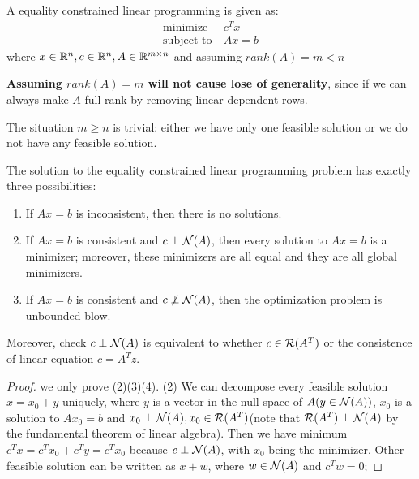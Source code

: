 \begin{refsection}
\begin{definition}
	A equality constrained linear programming is given as:
	\begin{align*}
	\text{minimize} ~ &c^Tx\\
	\text{subject to} ~ & Ax=b
	\end{align*}
	where $x\in \mathbb{R}^n,c\in \mathbb{R}^n, A\in \mathbb{R}^{m\times n}$ and assuming $rank(A) = m<n$
\end{definition}


\begin{remark}
	\textbf{Assuming $rank(A) = m$ will not cause lose of generality}, since if we can always make $A$ full rank by removing linear dependent rows.
\end{remark}


\begin{remark}
	The situation $m\geq n$ is trivial: either we have only one feasible solution or we do not have any feasible solution.
\end{remark}




\begin{theorem}\label{ch:linear-optimization:th:EqualityConstraintSolutionProperty}
	\cite[lec 5]{Robinson2015nonlinear2}The solution to the equality constrained linear programming problem has exactly three possibilities:
	\begin{enumerate}
		\item If $Ax=b$ is inconsistent, then there is no solutions.
		\item If $Ax=b$ is consistent and $c \perp \mathcal{N}(A)$, then every solution to $Ax=b$ is a minimizer; moreover, these minimizers are all equal and they are all global minimizers.
		\item If $Ax=b$ is consistent and $c \not\perp \mathcal{N}(A)$, then the optimization problem is unbounded blow.      
	\end{enumerate}
	Moreover, check $c\perp \mathcal{N}(A)$ is equivalent to whether $c \in \mathcal{R}(A^T)$ or the consistence of linear equation $c=A^Tz$.
\end{theorem}
\begin{proof}
	we only prove (2)(3)(4). (2) We can decompose every feasible solution $x = x_0+y$ uniquely, where $y$ is a vector in the null space of $A(y\in \mathcal{N}(A))$, $x_0$ is a solution to $Ax_0=b$ and $x_0 \perp \mathcal{N}(A), x_0 \in \mathcal{R}(A^T)$(note that $\mathcal{R}(A^T)\perp \mathcal{N}(A)$ by the fundamental theorem of linear algebra). Then we have minimum $c^Tx = c^Tx_0 + c^Ty = c^Tx_0$ because $c \perp \mathcal{N}(A)$, with $x_0$ being the minimizer. Other feasible solution can be written as $x+w$, where $w\in \mathcal{N}(A)$ and $c^Tw = 0$;
	

\end{proof}
\end{refsection}
